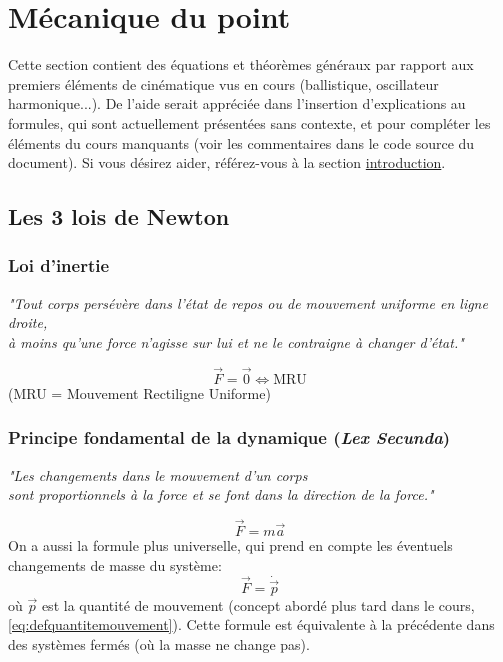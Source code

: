 \documentclass{article}
\numberwithin{equation}{section}
\begin{document}
\section{Mécanique du point}
Cette section contient des équations et théorèmes généraux par rapport aux premiers éléments de cinématique vus en cours (ballistique, oscillateur harmonique...). De l'aide serait appréciée dans l'insertion d'explications au formules, qui sont actuellement présentées sans contexte, et pour compléter les éléments du cours manquants (voir les commentaires dans le code source du document). Si vous désirez aider, référez-vous à la section \hyperref[sec:introduction]{introduction}.

\subsection{Les 3 lois de Newton}

\subsubsection{Loi d'inertie}
\begin{center}
	\emph{"Tout corps persévère dans l'état de repos ou de mouvement uniforme en ligne droite, \\
	 à moins qu'une force n'agisse sur lui et ne le contraigne à changer d'état."}
\end{center}
\begin{equation}
	\boxed{\vec F = \vec 0 \Leftrightarrow \text{MRU}}
\end{equation}
(MRU = Mouvement Rectiligne Uniforme)

\subsubsection{Principe fondamental de la dynamique (\emph{Lex Secunda})}
\begin{center}
	\emph{"Les changements dans le mouvement d'un corps \\ sont proportionnels à la force et se font dans la direction de la force."}
\end{center}
\begin{equation} \label{eq:lexsecunda}
	\boxed{\vec F = m \vec a}
\end{equation}
On a aussi la formule plus universelle, qui prend en compte les éventuels changements de masse du système:
\begin{equation*}
	\boxed{ \vec F = \dot{\vec p} }
\end{equation*}
où \(\vec p\) est la quantité de mouvement (concept abordé plus tard dans le cours, \ref{eq:defquantitemouvement}). Cette formule est équivalente à la précédente dans des systèmes fermés (où la masse ne change pas). \\
\end{document}
